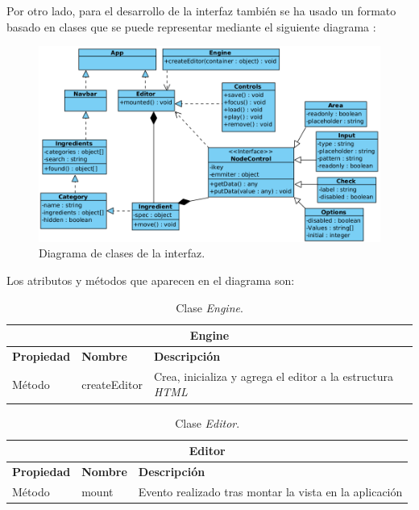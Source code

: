 \newpage
Por otro lado, para el desarrollo de la interfaz también se ha usado un formato basado en clases que se puede representar mediante el siguiente diagrama :\sn

\begin{figure}[H]
    \centering
    \includegraphics[width=15cm]{img/tables/22_Class-Diagram-UserInterface.png}
    \caption{Diagrama de clases de la interfaz.}
    \label{fig:interfaceclassdiagram}
\end{figure}

Los atributos y métodos que aparecen en el diagrama son:\sn

\begin{table}[H]
    \begin{center}
        \begin{tabularx}{\textwidth}{| l | l | X |}
            \hline
            \multicolumn{3}{c}{ \textbf{Engine} } \\ \hline
            \textbf{Propiedad} & \textbf{Nombre} & \textbf{Descripción} \\ \hline
            Método & createEditor & Crea, inicializa y agrega el editor a la estructura \textit{HTML} \\ \hline
        \end{tabularx}
    \end{center}
    \caption{Clase \textit{Engine}.}
    \label{tab:classEngine}
\end{table}

\begin{table}[H]
    \begin{center}
        \begin{tabularx}{\textwidth}{| l | l | X |}
            \hline
            \multicolumn{3}{c}{ \textbf{Editor} } \\ \hline
            \textbf{Propiedad} & \textbf{Nombre} & \textbf{Descripción} \\ \hline
            Método & mount & Evento realizado tras montar la vista en la aplicación \\ \hline
        \end{tabularx}
    \end{center}
    \caption{Clase \textit{Editor}.}
    \label{tab:classEditor}
\end{table}


